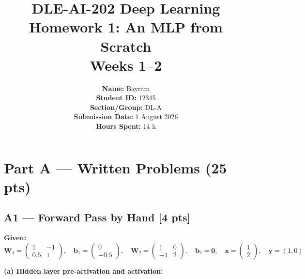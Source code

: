\documentclass[11pt,a4paper]{article}
\title{
    \vspace{-0.5in}
    {\Huge\bfseries DLE-AI-202 Deep Learning} \\[0.3in]
    {\LARGE Homework 1: An MLP from Scratch} \\[0.1in]
    {\large Weeks 1--2}
}
\author{
    \textbf{Name:} Bayram \\[0.05in]
    \textbf{Student ID:} 12345 \\[0.05in]
    \textbf{Section/Group:} DL-A \\[0.05in]
    \textbf{Submission Date:} 1 August 2026 \\[0.05in]
    \textbf{Hours Spent:} 14 h
}
\date{}
\begin{document}
\maketitle

\vspace{-0.2in}
\begin{center}
\end{center}

\section{Part A --- Written Problems (25 pts)}

\subsection*{A1 --- Forward Pass by Hand \hfill [4 pts]}

\textbf{Given:}
\[
\mathbf{W}_1=\begin{pmatrix}1 & -1\\[2pt] 0.5 & 1\end{pmatrix},\quad
\mathbf{b}_1=\begin{pmatrix}0\\[2pt] -0.5\end{pmatrix},\quad
\mathbf{W}_2=\begin{pmatrix}1 & 0\\[2pt] -1 & 2\end{pmatrix},\quad
\mathbf{b}_2=\mathbf{0},\quad
\mathbf{x}=\begin{pmatrix}1\\[2pt] 2\end{pmatrix},\quad
\mathbf{y}=(1,0)
\]

\textbf{(a) Hidden layer pre-activation and activation:}
\end{document}
